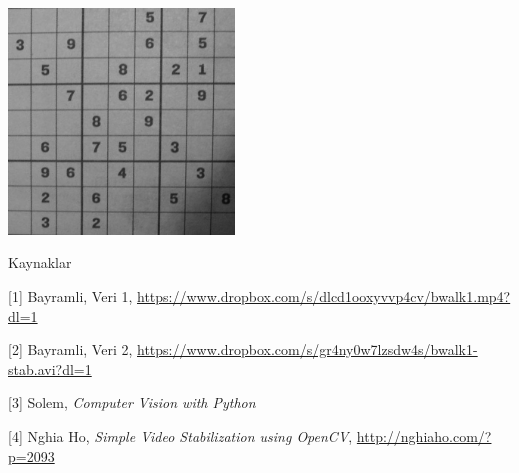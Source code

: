 \documentclass[12pt,fleqn]{article}\usepackage{../../common}
\begin{document}
\includegraphics[height=6cm]{vision_30vstab_05.png}





Kaynaklar

[1] Bayramli, Veri 1, \url{https://www.dropbox.com/s/dlcd1ooxyvvp4cv/bwalk1.mp4?dl=1}

[2] Bayramli, Veri 2, \url{https://www.dropbox.com/s/gr4ny0w7lzsdw4s/bwalk1-stab.avi?dl=1}

[3] Solem, {\em Computer Vision with Python}

[4] Nghia Ho, {\em Simple Video Stabilization using OpenCV},
    \url{http://nghiaho.com/?p=2093}
\end{document}
